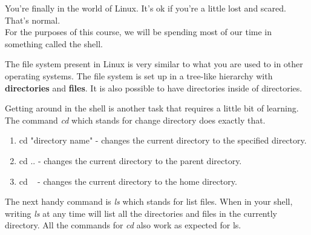 
You're finally in the world of Linux.  It's ok if you're a little lost and scared.  That's normal.\\

For the purposes of this course, we will be spending most of our time in something called the shell.\\



The file system present in Linux is very similar to what you are used to in other operating systems.  The file system is set up in a tree-like hierarchy with \textbf{directories} and \textbf{files}.  It is also possible to have directories inside of directories.\\


Getting around in the shell is another task that requires a little bit of learning.  The command \emph{cd}  which stands for change directory does exactly that.\\

\begin{enumerate}

\item cd "directory name" - changes the current directory to the specified directory.
\item cd .. - changes the current directory to the parent directory.
\item cd ~ - changes the current directory to the home directory.

\end{enumerate}

The next handy command is \emph{ls} which stands for list files.  When in your shell, writing \emph{ls} at any time will list all the directories and files in the currently directory. All the commands for \emph{cd} also work as expected for ls.\\

